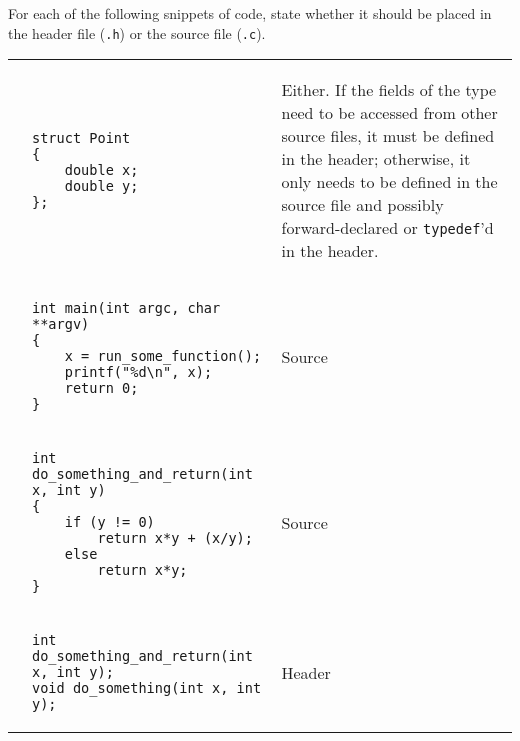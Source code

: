 For each of the following snippets of code, state whether it should be placed in the header file (\texttt{.h}) or the source file (\texttt{.c}).

\begin{enumerate}

\begin{tabular}{p{.25in}p{1.5in} p{4.5in}}
\item
&
{
\begin{lstlisting}[numbers=none]
struct Point
{
	double x;
	double y;
};
\end{lstlisting}
}
&
\begin{answer}
Either. If the fields of the type need to be accessed from other source files, it must be defined in the header; otherwise, it only needs to be defined in the source file and possibly forward-declared or \texttt{typedef}'d in the header.
\end{answer}
\\
\item
&
{
\begin{lstlisting}[numbers=none]
int main(int argc, char **argv)
{
	x = run_some_function();
	printf("%d\n", x);
	return 0;
}
\end{lstlisting}
}
&
\begin{answer}
\hspace{1.5in}
Source
\end{answer}
\\
\item
&
{
\begin{lstlisting}[numbers=none]
int do_something_and_return(int x, int y)
{
	if (y != 0)
		return x*y + (x/y);
	else
		return x*y;
}
\end{lstlisting}
}
&
\begin{answer}
\hspace{2.5in}
Source
\end{answer}
\\
\item
&
{
\begin{lstlisting}[numbers=none]
int do_something_and_return(int x, int y);
void do_something(int x, int y);
\end{lstlisting}
}
&
\begin{answer}
\hspace{2.5in}
Header
\end{answer}
\\
\end{tabular}
\end{enumerate}
